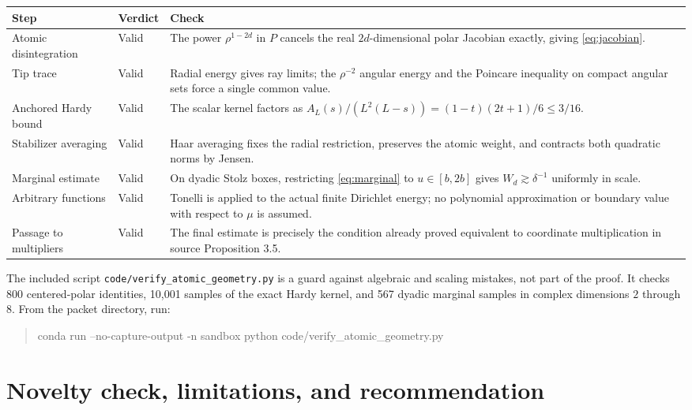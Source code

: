 \documentclass[11pt]{article}
\theoremstyle{remark}
\begin{document}
\begin{center}
\begin{tabular}{@{}p{}p{}p{}@{}}
\toprule
Step & Verdict & Check \\
\midrule
Atomic disintegration & Valid & The power $\rho^{1-2d}$ in $P$ cancels the
real $2d$-dimensional polar Jacobian exactly, giving
\eqref{eq:jacobian}. \\
Tip trace & Valid & Radial energy gives ray limits; the
$\rho^{-2}$ angular energy and the Poincare inequality on compact angular
sets force a single common value. \\
Anchored Hardy bound & Valid & The scalar kernel factors as
$A_L(s)/(L^2(L-s))=(1-t)(2t+1)/6\leq3/16$. \\
Stabilizer averaging & Valid & Haar averaging fixes the radial restriction,
preserves the atomic weight, and contracts both quadratic norms by Jensen. \\
Marginal estimate & Valid & On dyadic Stolz boxes, restricting
\eqref{eq:marginal} to $u\in[b,2b]$ gives $W_d\gtrsim\delta^{-1}$ uniformly
in scale. \\
Arbitrary functions & Valid & Tonelli is applied to the actual finite
Dirichlet energy; no polynomial approximation or boundary value with respect
to $\mu$ is assumed. \\
Passage to multipliers & Valid & The final estimate is precisely the
condition already proved equivalent to coordinate multiplication in source
Proposition 3.5. \\
\bottomrule
\end{tabular}
\end{center}

The included script \texttt{code/verify\_atomic\_geometry.py} is a guard
against algebraic and scaling mistakes, not part of the proof.  It checks 800
centered-polar identities, 10,001 samples of the exact Hardy kernel, and 567
dyadic marginal samples in complex dimensions $2$ through $8$.  From the
packet directory, run:
\begin{quote}\small\ttfamily
conda run --no-capture-output -n sandbox python code/verify\_atomic\_geometry.py
\end{quote}

\section{Novelty check, limitations, and recommendation}
\end{document}
